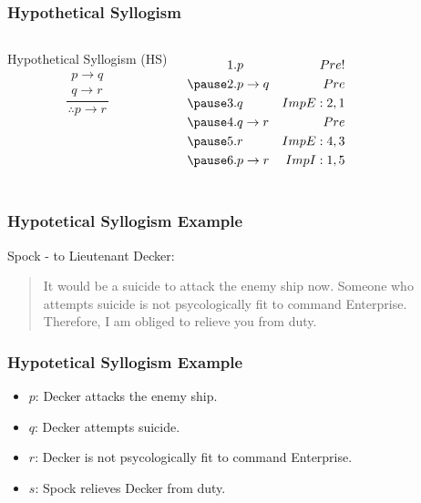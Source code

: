 \documentclass[dvipsnames]{beamer}
\begin{document}
\begin{frame}
  \frametitle{Hypothetical Syllogism}

  \begin{columns}
    \begin{block}{Hypothetical Syllogism (HS)}
      \[
      \frac
        {
          \begin{array}{c}
            p \rightarrow q\\
            q \rightarrow r
          \end{array}}
        {
          \therefore p \rightarrow r
        }
      \]
    \end{block}

    \pause
    \begin{eqnarray*}
      1. & p               & Pre!\\
      \pause
      2. & p \rightarrow q & Pre\\
      \pause
      3. & q               & ImpE:2,1\\
      \pause
      4. & q \rightarrow r & Pre\\
      \pause
      5. & r               & ImpE:4,3\\
      \pause
      6. & p \rightarrow r & ImpI:1,5\\
    \end{eqnarray*}
  \end{columns}
\end{frame}

\begin{frame}
  \frametitle{Hypotetical Syllogism Example}

  \begin{example}
    Spock - to Lieutenant Decker:
    \begin{quote}
      It would be a suicide to attack the enemy ship now. Someone who attempts
      suicide is not psycologically fit to command Enterprise. Therefore, I am
      obliged to relieve you from duty.
    \end{quote}
  \end{example}
\end{frame}

\begin{frame}
  \frametitle{Hypotetical Syllogism Example}

  \begin{example}
    \begin{itemize}
      \item $p$: Decker attacks the enemy ship.
      \item $q$: Decker attempts suicide.
      \item $r$: Decker is not psycologically fit to command Enterprise.
      \item $s$: Spock relieves Decker from duty.
    \end{itemize}
  \end{example}
\end{frame}
\end{document}
